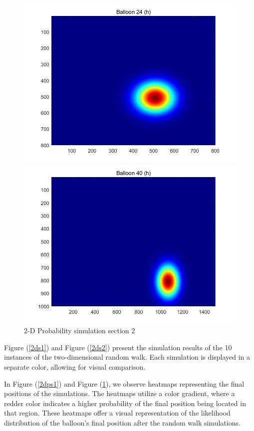 \documentclass{article}
\begin{document}
\begin{multicols}{2}
\begin{figure}[ht]
\begin{minipage}{0.45\linewidth}
\includegraphics[width=0.8\linewidth]{graph/2ddis1.png} 
\caption{2-D Probability simulation section 2}
\label{2dps1}
\end{minipage}
\hfill
\begin{minipage}{0.45\linewidth}
\centering
\includegraphics[width=0.8\linewidth]{graph/2ddis2.png} 
\caption{2-D Probability simulation section 2}
\label{2dps2}
\end{minipage}
\end{figure}
\indent\setlength{\parindent}{2em}Figure (\ref{2ds1}) and Figure (\ref{2ds2}) present the simulation results of the 10 instances of the two-dimensional random walk. Each simulation is displayed in a separate color, allowing for visual comparison.

In Figure (\ref{2dps1}) and Figure (\ref{2dps2}), we observe heatmaps representing the final positions of the simulations. The heatmaps utilize a color gradient, where a redder color indicates a higher probability of the final position being located in that region. These heatmaps offer a visual representation of the likelihood distribution of the balloon's final position after the random walk simulations.






\end{multicols}
\end{document}
